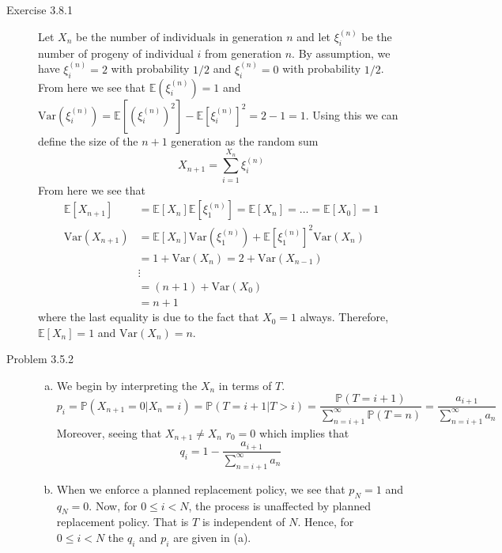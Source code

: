 \documentclass[12pt]{article}  %
\newcommand{\E}{{\mathbb{E}}}
\newcommand{\V}{{\text{Var}}}
\newcommand{\prob}{{\mathbb{P}}}
\begin{document}
\begin{description}
\item[Exercise 3.8.1]Let $X_n$ be the number of individuals in generation $n$ and let $\xi^{(n)}_i$ be the number of progeny of individual $i$ from generation $n$. By assumption, we have $\xi_{i}^{(n)} = 2$ with probability $1/2$ and $\xi_{i}^{(n)} = 0$ with probability $1/2$. From here we see that $\E(\xi_{i}^{(n)}) = 1$ and $\V(\xi_{i}^{(n)}) = \E[(\xi_{i}^{(n)})^2] - \E[\xi_{i}^{(n)}]^2 = 2 - 1 = 1$. Using this we can define the size of the $n+1$ generation as the random sum $$X_{n+1} = \sum_{i = 1}^{X_n}\xi_i^{(n)}$$ From here we see that 
\begin{align*}
\E[X_{n+1}] &= \E[X_n]\E[\xi_1^{(n)}] = \E[X_n] = \ldots = \E[X_0] = 1\\
\V(X_{n+1}) &= \E[X_n]\V(\xi_1^{(n)}) + \E[\xi_1^{(n)}]^2\V(X_n)\\
&= 1 + \V(X_n) = 2 + \V(X_{n-1})\\
&\vdots\\
&= (n+1)+\V(X_0)\\  
&= n+1
\end{align*}
where the last equality is due to the fact that $X_0 = 1$ always. Therefore, $\E[X_n] = 1$ and $\V(X_n) = n$. 


\item[Problem 3.5.2]
\begin{enumerate}[(a)]
\item We begin by interpreting the $X_n$ in terms of $T$. 
$$p_i = \prob(X_{n+1} = 0|X_n = i) = \prob(T = i + 1|T>i) = \frac{\prob(T = i+1)}{\sum_{n = i+1}^{\infty}\prob(T = n)} = \frac{a_{i+1}}{\sum_{n = i+1}^{\infty}a_n}$$
Moreover, seeing that $X_{n+1} \neq X_{n}$ $r_0 = 0$ which implies that $$q_i = 1 -\frac{a_{i+1}}{\sum_{n = i+1}^{\infty}a_n} $$
\item When we enforce a planned replacement policy, we see that $p_N = 1$ and $q_N = 0$. Now, for $0\leq i <N$, the process is unaffected by planned replacement policy. That is $T$ is independent of $N$. Hence, for $0\leq i <N$ the $q_i$ and $p_i$ are given in (a).
\end{enumerate}


\end{description}
\end{document}
